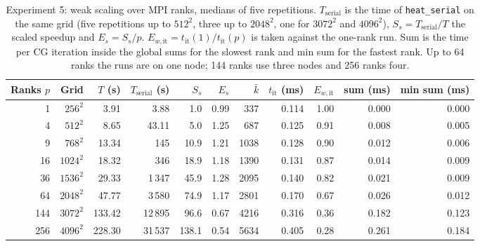 \begin{table}[!t]
\centering
\small
\begin{tabular}{rrrrrrrrrrr}
\toprule
Ranks $p$ & Grid & $T$ (s) & $T_{\mathrm{serial}}$ (s) & $S_s$ & $E_s$ & $\bar k$ & $t_{\mathrm{it}}$ (ms) & $E_{w,\mathrm{it}}$ & sum (ms) & min sum (ms) \\
\midrule
1 & $256^2$ & 3.91 & 3.88 & 1.0 & 0.99 & 337 & 0.114 & 1.00 & 0.000 & 0.000 \\
4 & $512^2$ & 8.65 & 43.11 & 5.0 & 1.25 & 687 & 0.125 & 0.91 & 0.008 & 0.005 \\
9 & $768^2$ & 13.34 & 145 & 10.9 & 1.21 & 1038 & 0.128 & 0.90 & 0.012 & 0.006 \\
16 & $1024^2$ & 18.32 & 346 & 18.9 & 1.18 & 1390 & 0.131 & 0.87 & 0.014 & 0.009 \\
36 & $1536^2$ & 29.33 & 1\,347 & 45.9 & 1.28 & 2095 & 0.140 & 0.82 & 0.021 & 0.009 \\
64 & $2048^2$ & 47.77 & 3\,580 & 74.9 & 1.17 & 2801 & 0.170 & 0.67 & 0.026 & 0.012 \\
144 & $3072^2$ & 133.42 & 12\,895 & 96.6 & 0.67 & 4216 & 0.316 & 0.36 & 0.182 & 0.123 \\
256 & $4096^2$ & 228.30 & 31\,537 & 138.1 & 0.54 & 5634 & 0.405 & 0.28 & 0.261 & 0.184 \\
\bottomrule
\end{tabular}
\caption{Experiment 5: weak scaling over MPI ranks, medians of five repetitions. $T_{\mathrm{serial}}$ is the time of \texttt{heat\_serial} on the same grid (five repetitions up to $512^2$, three up to $2048^2$, one for $3072^2$ and $4096^2$), $S_s=T_{\mathrm{serial}}/T$ the scaled speedup and $E_s=S_s/p$. $E_{w,\mathrm{it}}=t_{\mathrm{it}}(1)/t_{\mathrm{it}}(p)$ is taken against the one-rank run. Sum is the time per CG iteration inside the global sums for the slowest rank and min sum for the fastest rank. Up to 64 ranks the runs are on one node; 144 ranks use three nodes and 256 ranks four.}
\label{tab:weak-mpi}
\end{table}
